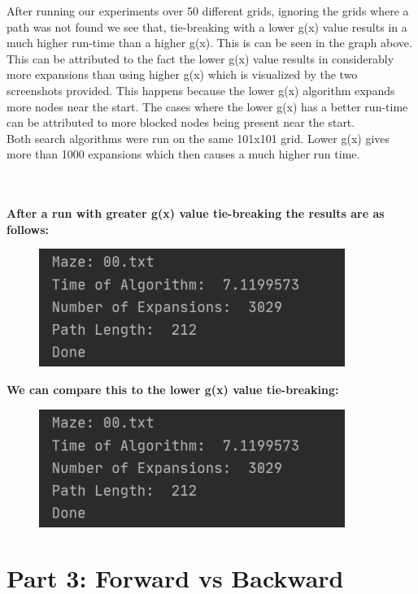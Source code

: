 \documentclass{article}
\begin{document}
After running our experiments over 50 different grids, ignoring the grids where a path was not found we see that, tie-breaking with a lower g(x) value results in a much higher run-time than a higher g(x). This is can be seen in the graph above.\\
This can be attributed to the fact the lower g(x) value results in considerably more expansions than using higher g(x) which is visualized by the two screenshots provided. This happens because the lower g(x) algorithm expands more nodes near the start. The cases where the lower g(x) has a better run-time can be attributed to more blocked nodes being present near the start.\\
Both search algorithms were run on the same 101x101 grid. Lower g(x) gives more than 1000 expansions which then causes a much higher run time. 

\\
\\
\textbf{After a run with greater g(x) value tie-breaking the results are as follows:}

\begin{figure}[h!]
\centerline{\includegraphics[scale=.5]{highergtie.png}}
\label{fig}
\end{figure}

\textbf{We can compare this to the lower g(x) value tie-breaking: }

\begin{figure}[h!]
\centerline{\includegraphics[scale=.5]{lowergtie.png}}
\label{fig}
\end{figure}

\clearpage

\section*{Part 3: Forward vs Backward}
\end{document}

